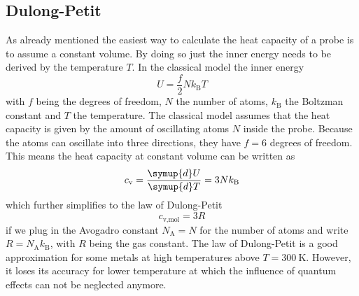 \subsection{Dulong-Petit}
As already mentioned the easiest way to calculate the heat capacity of a probe is to assume a constant volume.
By doing so just the inner energy needs to be derived by the temperature $T$.
In the classical model the inner energy
\begin{equation*}
    U = \frac{f}{2}Nk_\text{B}T
\end{equation*}
with $f$ being the degrees of freedom, $N$ the number of atoms, $k_\text{B}$ the Boltzman constant and $T$ the temperature.
The classical model assumes that the heat capacity is given by the amount of oscillating atoms $N$ inside the probe.
Because the atoms can oscillate into three directions, they have $f=6$ degrees of freedom.
This means the heat capacity at constant volume can be written as 
\begin{equation*}
    c_\text{v} = \frac{\symup{d}U}{\symup{d}T} = 3Nk_\text{B}
\end{equation*}
which further simplifies to the law of Dulong-Petit
\begin{equation}
    c_\text{v,mol} = 3R
    \label{eq:dulong}
\end{equation}
if we plug in the Avogadro constant $N_\text{A} = N$ for the number of atoms and write $R = N_\text{A} k_\text{B}$, with $R$ being the gas constant.
The law of Dulong-Petit is a good approximation for some metals at high temperatures above $T = \SI{300}{\K}$.
However, it loses its accuracy for lower temperature at which the influence of quantum effects can not be neglected anymore.
